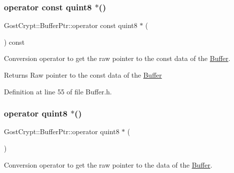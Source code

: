 \mbox{\label{class_gost_crypt_1_1_buffer_ptr_afa63d10b1a96abc0d2f9f970b3757036}} 
\subsubsection{\texorpdfstring{operator const quint8 $\ast$()}{operator const quint8 *()}}
{\footnotesize\ttfamily Gost\+Crypt\+::\+Buffer\+Ptr\+::operator const quint8 $\ast$ (\begin{DoxyParamCaption}{ }\end{DoxyParamCaption}) const\hspace{0.3cm}{\ttfamily [inline]}}



Conversion operator to get the raw pointer to the const data of the \hyperlink{class_gost_crypt_1_1_buffer}{Buffer}. 

\begin{DoxyReturn}{Returns}
Raw pointer to the const data of the \hyperlink{class_gost_crypt_1_1_buffer}{Buffer} 
\end{DoxyReturn}


Definition at line 55 of file Buffer.\+h.

\mbox{\label{class_gost_crypt_1_1_buffer_ptr_a26f6c7dee1ea552efd12e0141ccde215}} 
\subsubsection{\texorpdfstring{operator quint8 $\ast$()}{operator quint8 *()}}
{\footnotesize\ttfamily Gost\+Crypt\+::\+Buffer\+Ptr\+::operator quint8 $\ast$ (\begin{DoxyParamCaption}{ }\end{DoxyParamCaption})\hspace{0.3cm}{\ttfamily [inline]}}



Conversion operator to get the raw pointer to the data of the \hyperlink{class_gost_crypt_1_1_buffer}{Buffer}. 


